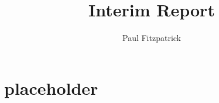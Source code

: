 \documentclass{ContactProject}
\title{Interim Report}
\author{Paul Fitzpatrick}
\begin{document}


\maketitle




\clearpage














\chapter{placeholder}
\end{document}
